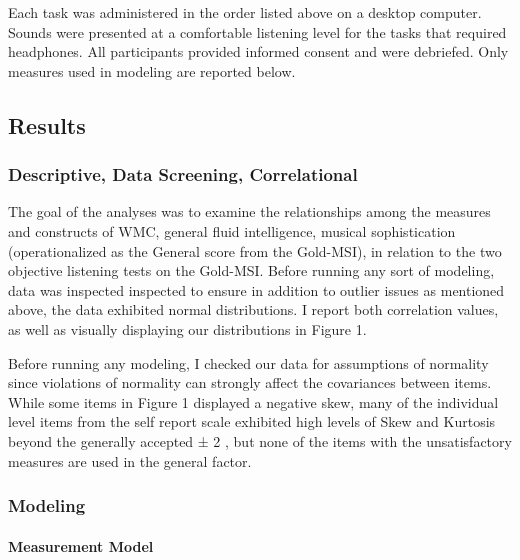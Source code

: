 \documentclass[]{book}
\let\oldparagraph\paragraph
\renewcommand{\paragraph}[1]{\oldparagraph{#1}\mbox{}}
\begin{document}
Each task was administered in the order listed above on a desktop computer.
Sounds were presented at a comfortable listening level for the tasks that required headphones.
All participants provided informed consent and were debriefed.
Only measures used in modeling are reported below.

\hypertarget{results}{%
\subsection{Results}\label{results}}

\hypertarget{descriptive-data-screening-correlational}{%
\subsubsection{Descriptive, Data Screening, Correlational}\label{descriptive-data-screening-correlational}}

The goal of the analyses was to examine the relationships among the measures and constructs of WMC, general fluid intelligence, musical sophistication (operationalized as the General score from the Gold-MSI), in relation to the two objective listening tests on the Gold-MSI.
Before running any sort of modeling, data was inspected inspected to ensure in addition to outlier issues as mentioned above, the data exhibited normal distributions.
I report both correlation values, as well as visually displaying our distributions in Figure 1.

Before running any modeling, I checked our data for assumptions of normality since violations of normality can strongly affect the covariances between items.
While some items in Figure 1 displayed a negative skew, many of the individual level items from the self report scale exhibited high
levels of Skew and Kurtosis beyond the generally accepted ± 2 \citep{fieldDiscoveringStatisticsUsing2012}, but none of the items with the unsatisfactory measures are used in the general factor.

\hypertarget{modeling}{%
\subsubsection{Modeling}\label{modeling}}

\hypertarget{measurement-model}{%
\paragraph{Measurement Model}\label{measurement-model}}
\end{document}

